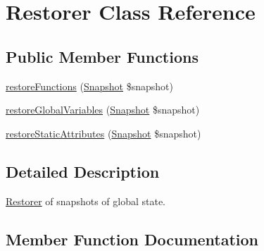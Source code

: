 \hypertarget{class_sebastian_bergmann_1_1_global_state_1_1_restorer}{}\section{Restorer Class Reference}
\label{class_sebastian_bergmann_1_1_global_state_1_1_restorer}
\subsection*{Public Member Functions}
\begin{DoxyCompactItemize}
\item 
\mbox{\hyperlink{class_sebastian_bergmann_1_1_global_state_1_1_restorer_aadd43cc05568c9b40339612477d82c24}{restore\+Functions}} (\mbox{\hyperlink{class_sebastian_bergmann_1_1_global_state_1_1_snapshot}{Snapshot}} \$snapshot)
\item 
\mbox{\hyperlink{class_sebastian_bergmann_1_1_global_state_1_1_restorer_a1adc1df008a579db8c01d4605d77d605}{restore\+Global\+Variables}} (\mbox{\hyperlink{class_sebastian_bergmann_1_1_global_state_1_1_snapshot}{Snapshot}} \$snapshot)
\item 
\mbox{\hyperlink{class_sebastian_bergmann_1_1_global_state_1_1_restorer_af31a3b378cbf1e26ce46b134064ec297}{restore\+Static\+Attributes}} (\mbox{\hyperlink{class_sebastian_bergmann_1_1_global_state_1_1_snapshot}{Snapshot}} \$snapshot)
\end{DoxyCompactItemize}


\subsection{Detailed Description}
\mbox{\hyperlink{class_sebastian_bergmann_1_1_global_state_1_1_restorer}{Restorer}} of snapshots of global state. 

\subsection{Member Function Documentation}
\mbox{\label{class_sebastian_bergmann_1_1_global_state_1_1_restorer_aadd43cc05568c9b40339612477d82c24}} 
